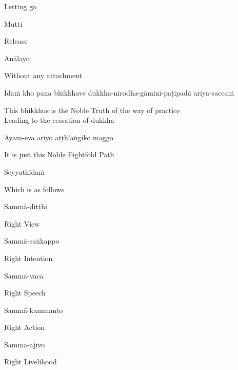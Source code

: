 \begin{cprenglish}
  Letting go
\end{cprenglish}

Mutti

\begin{cprenglish}
  Release
\end{cprenglish}

Anālayo

\begin{cprenglish}
  Without any attachment
\end{cprenglish}

Idaṁ kho pana bhikkhave dukkha-nirodha-gāminī-paṭipadā ariya-saccaṁ

\begin{cprenglish}
  This bhikkhus is the Noble Truth of the way of practice\\
  Leading to the cessation of dukkha
\end{cprenglish}

Ayam-eva ariyo aṭṭh’aṅgiko maggo

\begin{cprenglish}
  It is just this Noble Eightfold Path
\end{cprenglish}

Seyyathīdaṁ

\begin{cprenglish}
  Which is as follows
\end{cprenglish}

Sammā-diṭṭhi

\begin{cprenglish}
  Right View
\end{cprenglish}

Sammā-saṅkappo

\begin{cprenglish}
  Right Intention
\end{cprenglish}

Sammā-vācā

\begin{cprenglish}
  Right Speech
\end{cprenglish}

Sammā-kammanto

\begin{cprenglish}
  Right Action
\end{cprenglish}

Sammā-ājīvo

\begin{cprenglish}
  Right Livelihood
\end{cprenglish}

